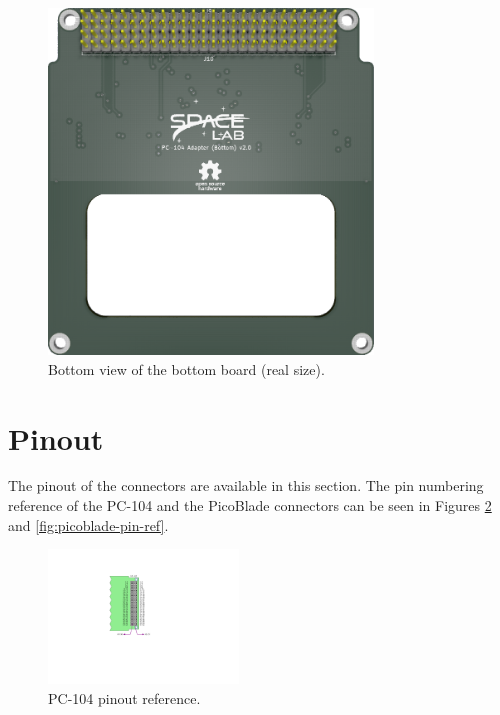 \begin{figure}[!htb]
    \begin{center}
        \includegraphics[width=8.626cm]{figures/pc104-adapter-bottom-bottom}
        \caption{Bottom view of the bottom board (real size).}
        \label{fig:bottom-board-bottom}
    \end{center}
\end{figure}

\section{Pinout}

The pinout of the connectors are available in this section. The pin numbering reference of the PC-104 and the PicoBlade connectors can be seen in Figures \ref{fig:pc104-reference} and \ref{fig:picoblade-pin-ref}.

\begin{figure}[!htb]
    \begin{center}
        \includegraphics[width=0.45\textwidth]{figures/pc104-diagram}
        \caption{PC-104 pinout reference.}
        \label{fig:pc104-reference}
    \end{center}
\end{figure}

